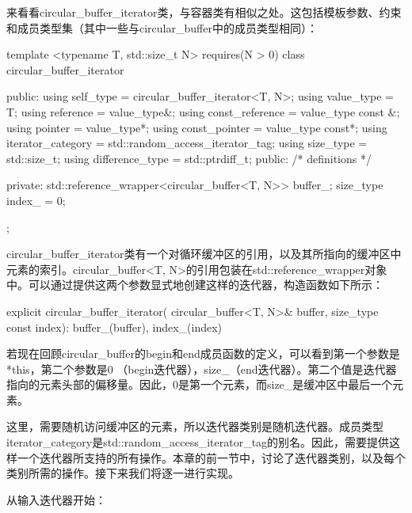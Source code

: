 来看看circular_buffer_iterator类，与容器类有相似之处。这包括模板参数、约束和成员类型集（其中一些与circular_buffer中的成员类型相同）：

\begin{cppcode}
template <typename T, std::size_t N>
requires(N > 0)
class circular_buffer_iterator
{
public:
	using self_type = circular_buffer_iterator<T, N>;
	using value_type = T;
	using reference = value_type&;
	using const_reference = value_type const &;
	using pointer = value_type*;
	using const_pointer = value_type const*;
	using iterator_category =
		std::random_access_iterator_tag;
	using size_type = std::size_t;
	using difference_type = std::ptrdiff_t;
public:
	/* definitions */
	
private:
	std::reference_wrapper<circular_buffer<T, N>> buffer_;
	size_type index_ = 0;
};
\end{cppcode}

circular_buffer_iterator类有一个对循环缓冲区的引用，以及其所指向的缓冲区中元素的索引。circular_buffer<T, N>的引用包装在std::reference_wrapper对象中。可以通过提供这两个参数显式地创建这样的迭代器，构造函数如下所示：

\begin{cppcode}
explicit circular_buffer_iterator(
	circular_buffer<T, N>& buffer,
	size_type const index):
	buffer_(buffer), index_(index)
{ }
\end{cppcode}

若现在回顾circular_buffer的begin和end成员函数的定义，可以看到第一个参数是*this，第二个参数是0 （begin迭代器），size_（end迭代器）。第二个值是迭代器指向的元素头部的偏移量。因此，0是第一个元素，而size_是缓冲区中最后一个元素。

这里，需要随机访问缓冲区的元素，所以迭代器类别是随机迭代器。成员类型iterator_category是std::random_access_iterator_tag的别名。因此，需要提供这样一个迭代器所支持的所有操作。本章的前一节中，讨论了迭代器类别，以及每个类别所需的操作。接下来我们将逐一进行实现。

从输入迭代器开始：


